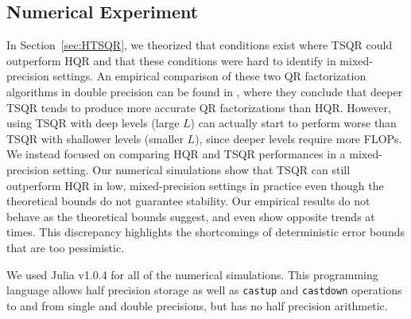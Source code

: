 \subsection{Numerical Experiment}
\label{sec:NE}
In Section~\ref{sec:HTSQR}, we theorized that conditions exist where TSQR could outperform HQR and that these conditions were hard to identify in mixed-precision settings. 
An empirical comparison of these two QR factorization algorithms in double precision can be found in \cite{Mori2012}, where they conclude that deeper TSQR tends to produce more accurate QR factorizations than HQR.
However, using TSQR with deep levels (large $L$) can actually start to perform worse than TSQR with shallower levels (smaller $L$), since deeper levels require more FLOPs.
We instead focused on comparing HQR and TSQR performances in a mixed-precision setting.
Our numerical simulations show that TSQR can still outperform HQR in low, mixed-precision settings in practice even though the theoretical bounds do not guarantee stability.
Our empirical results do not behave as the theoretical bounds suggest, and even show opposite trends at times. 
This discrepancy highlights the shortcomings of deterministic error bounds that are too pessimistic. \par
We used Julia v1.0.4 for all of the numerical simulations. 
This programming language allows half precision storage as well as {\tt castup} and {\tt castdown} operations to and from single and double precisions, but has no half precision arithmetic.
